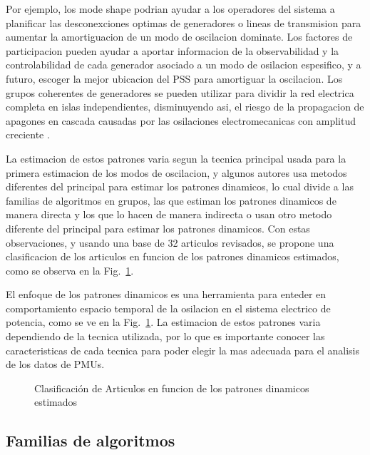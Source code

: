 Por ejemplo, los mode shape podrian ayudar a los operadores del sistema a planificar las 
desconexciones optimas de generadores o lineas de transmision para aumentar la amortiguacion de un modo de
oscilacion dominate. Los factores de participacion pueden ayudar a aportar informacion de la observabilidad y la
controlabilidad de cada generador asociado a un modo de osilacion espesifico, y a futuro, escoger la mejor
ubicacion del PSS para amortiguar la oscilacion. Los grupos coherentes de generadores se pueden utilizar para dividir
la red electrica completa en islas independientes, disminuyendo asi, el riesgo de la propagacion de apagones en 
cascada causadas por las osilaciones electromecanicas con amplitud creciente \cite{Jiang2017, Li2018, li2020era, jiang2021}. 

La estimacion de estos patrones varia segun la tecnica principal usada para la primera estimacion de los modos de 
oscilacion, y algunos autores usa metodos diferentes del principal para estimar los patrones dinamicos, lo cual divide 
a las familias de algoritmos en grupos, las que estiman los patrones dinamicos de manera directa y los que lo
hacen de manera indirecta o usan otro metodo diferente del principal para estimar los patrones dinamicos. Con estas 
observaciones, y usando una base de 32 articulos revisados, se propone una clasificacion de los articulos en funcion de 
los patrones dinamicos estimados, como se observa en la Fig.~\ref{fig:patrones_dinamicos}. 

El enfoque de los patrones dinamicos es una herramienta para enteder en comportamiento espacio temporal
de la osilacion en el sistema electrico de potencia, como se ve en la Fig.~\ref{fig:patrones_dinamicos}.
La estimacion de estos patrones varia dependiendo de la tecnica utilizada, por lo que es importante 
conocer las caracteristicas de cada tecnica para poder elegir la mas adecuada para el analisis de los 
datos de PMUs.   

\begin{figure}[H]
    \centering
     
    \caption{Clasificación de Articulos en funcion de los patrones dinamicos estimados}
    \label{fig:patrones_dinamicos} %
\end{figure}

\subsection{Familias de algoritmos}

